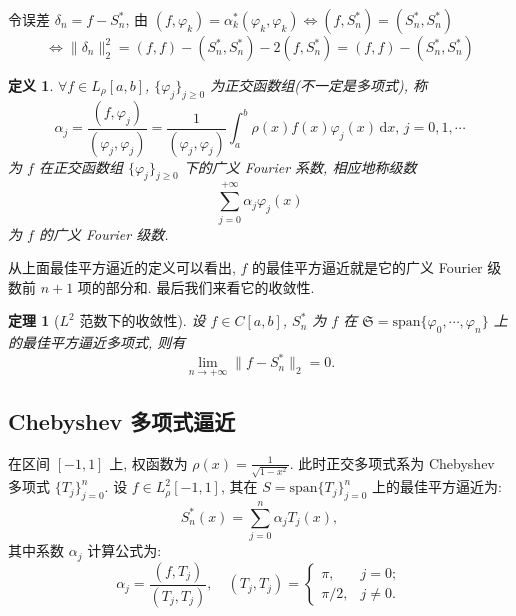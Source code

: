 \documentclass[UTF8, a4paper, 11pt]{ctexart}
\newtheorem{definition}{定义}[section]
\newtheorem{theorem}{定理}[section]
\begin{document}
令误差 $ \delta_n = f - S_n^* $, 由 $ (f, \varphi_k) = \alpha_k^* (\varphi_k, \varphi_k) \iff (f, S_n^*) = (S_n^*, S_n^*) $
\[ \iff \| \delta_n \|_2^2 = (f, f) - (S_n^*, S_n^*) - 2(f, S_n^*) = (f, f) - (S_n^*, S_n^*) \]

\begin{definition}
    $ \forall f \in L_{\rho}[a, b] $, $ \{\varphi_j\}_{j \geq 0} $ 为正交函数组(不一定是多项式), 称
    \begin{equation}
        \alpha_j = \frac{(f, \varphi_j)}{(\varphi_j, \varphi_j)} = \frac{1}{(\varphi_j, \varphi_j)} \int_a^b \rho(x) f(x) \varphi_j(x) \, \mathrm{d} x, \, j = 0, 1, \cdots
    \end{equation}
    为 $ f $ 在正交函数组 $ \{\varphi_j\}_{j \geq 0} $ 下的广义 Fourier 系数, 相应地称级数
    \[ \sum_{j=0}^{+\infty} \alpha_j \varphi_j(x) \]
    为 $ f $ 的广义 Fourier 级数.
\end{definition}
从上面最佳平方逼近的定义可以看出, $ f $ 的最佳平方逼近就是它的广义 Fourier 级数前 $ n+1 $ 项的部分和. 最后我们来看它的收敛性. 
\begin{theorem}[$ L^2 $ 范数下的收敛性]
    设 $ f \in C[a, b] $, $ S_n^* $ 为 $ f $ 在 $ \mathfrak{S} = \text{span}\{\varphi_0, \cdots, \varphi_n\} $ 上的最佳平方逼近多项式, 则有
\[ \lim_{n \rightarrow +\infty} \| f - S_n^* \|_2 = 0. \]
\end{theorem}

\subsection{Chebyshev 多项式逼近}
在区间 $[-1, 1]$ 上, 权函数为 $\rho(x) = \frac{1}{\sqrt{1-x^2}}$. 此时正交多项式系为 Chebyshev 多项式 $\{T_j\}_{j=0}^n$. 
设 $f \in L^2_{\rho}[-1, 1]$, 其在 $S = \text{span}\{T_j\}_{j=0}^n$ 上的最佳平方逼近为: 
\[ S_n^*(x) = \sum_{j=0}^n \alpha_j T_j(x), \]
其中系数 $\alpha_j$ 计算公式为: 
\[ \alpha_j = \frac{(f, T_j)}{(T_j, T_j)}, \quad (T_j, T_j) = \begin{cases} \pi, & j=0; \\ \pi/2, & j \ne 0. \end{cases} \]
\end{document}
